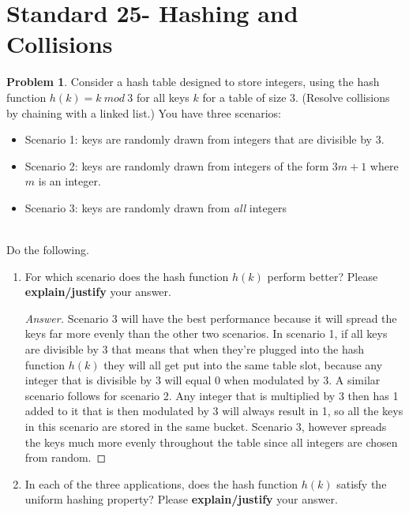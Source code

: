 \documentclass[11pt]{article}
\theoremstyle{definition}
\theoremstyle{definition}
\newtheorem{required}{Problem}
\theoremstyle{definition}
\begin{document}
\section{Standard 25- Hashing and Collisions}
\begin{required}
Consider a hash table designed to store integers, using the hash function $h(k)=k~mod~3$ for all keys $k$ for a table of size 3. (Resolve collisions by chaining with a linked list.) You have three scenarios: 
\begin{itemize}
\item Scenario 1: keys are randomly drawn from integers that are divisible by 3.

\item Scenario 2: keys are randomly drawn from integers of the form $3m+1$ where $m$ is an integer.

\item Scenario 3: keys are randomly drawn from \emph{all} integers
\end{itemize}


\noindent \\ Do the following.
\begin{enumerate}[label=(\alph*)]
\item For which scenario does the hash function $h(k)$ perform better? Please  {\bf explain/justify} your answer.


\begin{proof}[Answer]
Scenario 3 will have the best performance because it will spread the keys far more evenly than the other two scenarios. In scenario 1, if all keys are divisible by 3 that means that when they're plugged into the hash function $h(k)$ they will all get put into the same table slot, because any integer that is divisible by 3 will equal 0 when modulated by 3. A similar scenario follows for scenario 2. Any integer that is multiplied by 3 then has 1 added to it that is then modulated by 3 will always result in 1, so all the keys in this scenario are stored in the same bucket. Scenario 3, however spreads the keys much more evenly throughout the table since all integers are chosen from random.
\end{proof}

\newpage

\item In each of the three applications, does the hash function $h(k)$ satisfy the uniform hashing property? Please {\bf explain/justify} your answer.


\end{enumerate}
\end{required}
\end{document}
